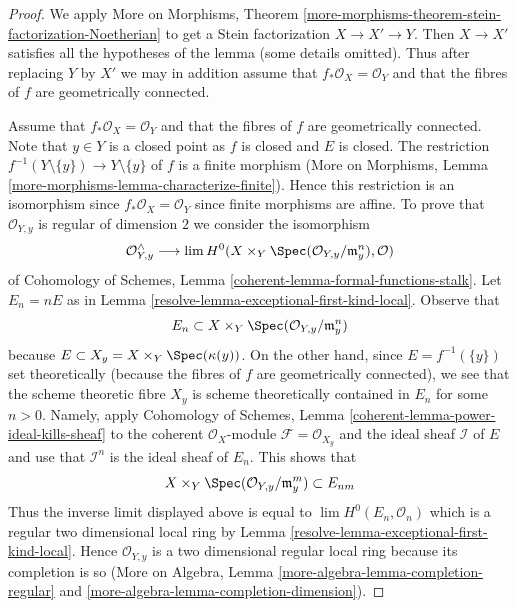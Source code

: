 \begin{proof}

We apply More on Morphisms, Theorem
\ref{more-morphisms-theorem-stein-factorization-Noetherian}
to get a Stein factorization $X \to X' \to Y$.
Then $X \to X'$ satisfies all the hypotheses of
the lemma (some details omitted).
Thus after replacing $Y$ by $X'$ we may in addition
assume that $f_*\mathcal{O}_X = \mathcal{O}_Y$ and
that the fibres of $f$ are geometrically connected.

\medskip\noindent
Assume that $f_*\mathcal{O}_X = \mathcal{O}_Y$ and
that the fibres of $f$ are geometrically connected.
Note that $y \in Y$ is a closed point as $f$ is closed and $E$ is closed.
The restriction $f^{-1}(Y \setminus \{y\}) \to Y \setminus \{y\}$
of $f$ is a finite morphism
(More on Morphisms, Lemma \ref{more-morphisms-lemma-characterize-finite}).
Hence this restriction is an isomorphism since
$f_*\mathcal{O}_X = \mathcal{O}_Y$ since finite morphisms are affine.
To prove that $\mathcal{O}_{Y, y}$ is regular of dimension
$2$ we consider the isomorphism
$$
\mathcal{O}_{Y, y}^\wedge \longrightarrow
\lim H^0(X \times_Y \Spec(\mathcal{O}_{Y, y}/\mathfrak m_y^n), \mathcal{O})
$$
of Cohomology of Schemes, Lemma \ref{coherent-lemma-formal-functions-stalk}.
Let $E_n = nE$ as in Lemma \ref{resolve-lemma-exceptional-first-kind-local}.
Observe that
$$
E_n \subset X \times_Y \Spec(\mathcal{O}_{Y, y}/\mathfrak m_y^n)
$$
because $E \subset X_y = X \times_Y \Spec(\kappa(y))$.
On the other hand, since $E = f^{-1}(\{y\})$ set theoretically
(because the fibres of $f$ are geometrically connected), we see that
the scheme theoretic fibre $X_y$ is scheme theoretically contained in
$E_n$ for some $n > 0$. Namely, apply
Cohomology of Schemes, Lemma \ref{coherent-lemma-power-ideal-kills-sheaf}
to the coherent $\mathcal{O}_X$-module $\mathcal{F} = \mathcal{O}_{X_y}$
and the ideal sheaf $\mathcal{I}$ of $E$ and use that
$\mathcal{I}^n$ is the ideal sheaf of $E_n$. This shows that
$$
X \times_Y \Spec(\mathcal{O}_{Y, y}/\mathfrak m_y^m) \subset E_{nm}
$$
Thus the inverse limit displayed above is equal to
$\lim H^0(E_n, \mathcal{O}_n)$
which is a regular two dimensional local ring by
Lemma \ref{resolve-lemma-exceptional-first-kind-local}.
Hence $\mathcal{O}_{Y, y}$ is a two dimensional regular local
ring because its completion is so
(More on Algebra, Lemma \ref{more-algebra-lemma-completion-regular} and
\ref{more-algebra-lemma-completion-dimension}).


\end{proof}
